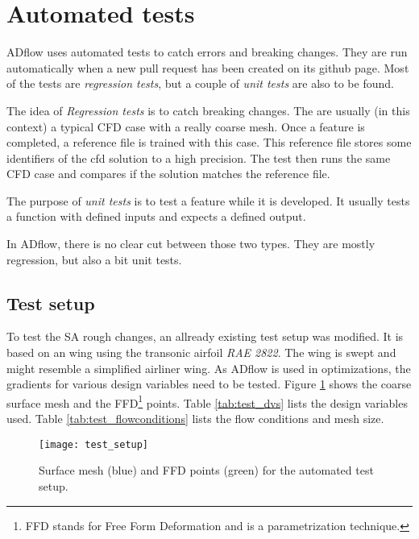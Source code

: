\section{Automated tests}
ADflow uses automated tests to catch errors and breaking changes. They are run
automatically when a new pull request has been created on its github page. Most
of the tests are \textit{regression tests}, but a couple of \textit{unit tests}
are also to be found.

The idea of \textit{Regression tests} is to catch breaking changes. The are
usually (in this context) a typical CFD case with a really coarse mesh. Once a
feature is completed, a reference file is trained with this case. This reference
file stores some identifiers of the cfd solution to a high precision. The test
then runs the same CFD case and compares if the solution matches the reference
file.

The purpose of \textit{unit tests} is to test a feature while it is developed.
It usually tests a function with defined inputs and expects a defined output.

In ADflow, there is no clear cut between those two types. They are mostly
regression, but also a bit unit tests.

\subsection{Test setup}
To test the SA rough changes, an allready existing test setup was modified. It
is based on an wing using the transonic airfoil \textit{RAE 2822}. The wing is
swept and might resemble a simplified airliner wing. As ADflow is used in
optimizations, the gradients for various design variables need to be tested.
Figure \ref{fig:test_setup} shows the coarse surface mesh and the
FFD\footnote{FFD stands for Free Form Deformation and is a parametrization
technique.} points. Table \ref{tab:test_dvs} lists the design variables used.
Table \ref{tab:test_flowconditions} lists the flow conditions and mesh size.

\begin{figure}[H] \centering
  \texttt{[image: test\_setup]}
  \caption{Surface mesh (blue) and FFD points (green) for the automated test setup.}
  \label{fig:test_setup}
\end{figure}


